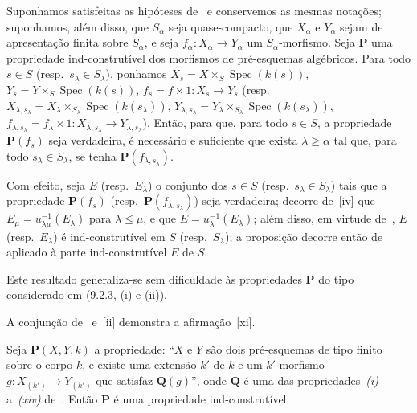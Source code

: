 \begin{proposition}[9.3.3]
\label{IV.9.3.3}
Suponhamos satisfeitas as hipóteses de~ e conservemos as mesmas notações; suponhamos, além disso, que $S_\alpha$ seja quase-compacto, que $X_\alpha$ e $Y_\alpha$ sejam de apresentação finita sobre $S_\alpha$, e seja $f_\alpha:X_\alpha\to Y_\alpha$ um $S_\alpha$-morfismo.
Seja $\mathbf{P}$ uma propriedade ind-construtível dos morfismos de pré-esquemas algébricos.
Para todo $s\in S$ \textnormal{(}resp.\ $s_\lambda\in S_\lambda$\textnormal{)}, ponhamos $X_s=X\times_S\operatorname{Spec}(k(s))$, $Y_s=Y\times_S\operatorname{Spec}(k(s))$, $f_s=f\times 1:X_s\to Y_s$ \textnormal{(}resp.\ $X_{\lambda,s_\lambda}=X_\lambda\times_{S_\lambda}\operatorname{Spec}(k(s_\lambda))$, $Y_{\lambda,s_\lambda}=Y_\lambda\times_{S_\lambda}\operatorname{Spec}(k(s_\lambda))$, $f_{\lambda,s_\lambda}=f_\lambda\times 1:X_{\lambda,s_\lambda}\to Y_{\lambda,s_\lambda}$\textnormal{)}.
Então, para que, para todo $s\in S$, a propriedade $\mathbf{P}(f_s)$ seja verdadeira, é necessário e suficiente que exista $\lambda\geqslant\alpha$ tal que, para todo $s_\lambda\in S_\lambda$, se tenha $\mathbf{P}(f_{\lambda,s_\lambda})$.
\end{proposition}

Com efeito, seja $E$ \textnormal{(}resp.\ $E_\lambda$\textnormal{)} o conjunto dos $s\in S$ \textnormal{(}resp.\ $s_\lambda\in S_\lambda$\textnormal{)} tais que a propriedade $\mathbf{P}(f_s)$ \textnormal{(}resp.\ $\mathbf{P}(f_{\lambda,s_\lambda})$\textnormal{)} seja verdadeira; decorre de~[iv] que $E_\mu=u_{\lambda\mu}^{-1}(E_\lambda)$ para $\lambda\leqslant\mu$, e que $E=u_\lambda^{-1}(E_\lambda)$; além disso, em virtude de~, $E$ \textnormal{(}resp.\ $E_\lambda$\textnormal{)} é ind-construtível em $S$ \textnormal{(}resp.\ $S_\lambda$\textnormal{)}; a proposição decorre então de~ aplicado à parte ind-construtível $E$ de $S$.


Este resultado generaliza-se sem dificuldade às propriedades $\mathbf{P}$ do tipo considerado em (9.2.3, (i) e (ii)).

\begin{remark}[9.3.4]
\label{IV.9.3.4}
A conjunção de~ e~[ii] demonstra a afirmação~[xi].
\end{remark}

\begin{proposition}[9.3.5]
\label{IV.9.3.5}
Seja $\mathbf{P}(X,Y,k)$ a propriedade: ``$X$ e $Y$ são dois pré-esquemas de tipo finito sobre o corpo $k$, e existe uma extensão $k'$ de $k$ e um $k'$-morfismo $g:X_{(k')}\to Y_{(k')}$ que satisfaz $\mathbf{Q}(g)$'', onde $\mathbf{Q}$ é uma das propriedades~\emph{(i)} a~\emph{(xiv)} de~.
Então $\mathbf{P}$ é uma propriedade ind-construtível.
\end{proposition}

